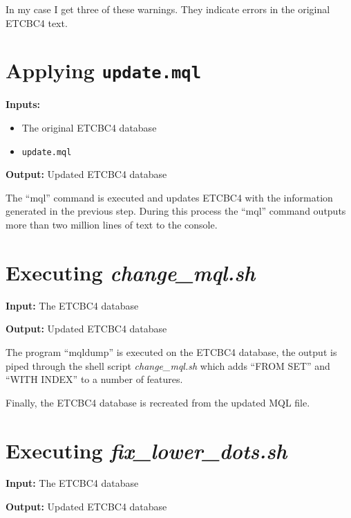 \documentclass[11pt,oneside,a4paper,article]{memoir}
\begin{document}
\vspace{1ex}

In my case I get three of these warnings. They indicate errors in the original ETCBC4 text.

\section{Applying \texttt{update.mql}}

\noindent \textbf{Inputs:}
\begin{itemize}
\item The original ETCBC4 database
\item \texttt{update.mql}
\end{itemize}

\noindent \textbf{Output:} Updated ETCBC4 database

\vspace{1ex}

The ``mql'' command is executed and updates ETCBC4 with the information generated in the previous
step. During this process the ``mql'' command outputs more than two million lines of text to the
console.

\section{Executing \emph{change\_mql.sh}}

\noindent \textbf{Input:} The ETCBC4 database

\noindent \textbf{Output:} Updated ETCBC4 database

\vspace{1ex}

The program ``mqldump'' is executed on the ETCBC4 database, the output is piped through the shell
script \emph{change\_mql.sh} which adds ``FROM SET'' and ``WITH INDEX'' to a number of features.

Finally, the ETCBC4 database is recreated from the updated MQL file.

\section{Executing \emph{fix\_lower\_dots.sh}}

\noindent \textbf{Input:} The ETCBC4 database

\noindent \textbf{Output:} Updated ETCBC4 database

\vspace{1ex}
\end{document}
